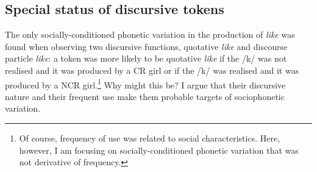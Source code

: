 







\subsection{Special status of discursive tokens}\label{sec:statusofdisc}

The only socially-conditioned phonetic variation in the production of \textit{like} was found when observing two discursive functions, quotative \textit{like} and discourse particle \textit{like}: a token was more likely to be quotative \textit{like} if the /k/ was not realised and it was produced by a CR girl or if the /k/ was realised and it was produced by a NCR girl.\footnote{Of course, frequency of use was related to social characteristics. Here, however, I am focusing on socially-conditioned phonetic variation that was not derivative of frequency.} Why might this be? I argue that their discursive nature and their frequent use make them probable targets of sociophonetic variation.

